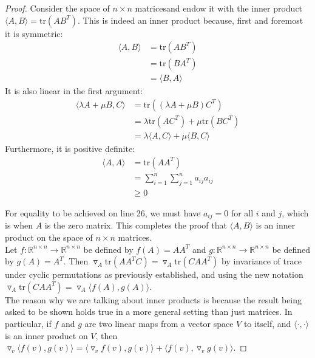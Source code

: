 \documentclass{article}
\begin{document}
\begin{proof}
Consider the space of $n \times n$ matricesand endow it 
with the inner product $\langle A, B \rangle = \mathrm{tr}(AB^T)$. This is indeed an 
inner product because, first and foremost it is symmetric:
\begin{align}
    \langle A, B \rangle &= \mathrm{tr}(AB^T) \\
    &= \mathrm{tr}(BA^T) \\
    &= \langle B, A \rangle
\end{align}
It is also linear in the first argument:
\begin{align}
    \langle \lambda A + \mu B, C \rangle &= \mathrm{tr}((\lambda A + \mu B) C^T) \\
    &= \lambda \mathrm{tr}(AC^T) + \mu \mathrm{tr}(BC^T) \\
    &= \lambda \langle A, C \rangle + \mu \langle B, C \rangle
\end{align}
Furthermore, it is positive definite:
\begin{align}
    \langle A, A \rangle &= \mathrm{tr}(AA^T) \\
    &= \sum_{i=1}^n \sum_{j=1}^n a_{ij} a_{ij} \\
    &\geq 0
\end{align}

For equality to be achieved on line 26, we must have $a_{ij} = 0$ for all $i$ and $j$, which is when 
$A$ is the zero matrix. This completes the proof that $\langle A, B \rangle$ is an inner product on 
the space of $n \times n$ matrices.\\

Let $f: \mathbb{R}^{n \times n} \rightarrow \mathbb{R}^{n \times n}$ be defined by $f(A) = A A^T$ and
$g: \mathbb{R}^{n \times n} \rightarrow \mathbb{R}^{n \times n}$ be defined by $g(A) = A^T$. Then 
$\triangledown_A \mathrm{tr}(A A^T C) = \triangledown_A \mathrm{tr}(C A A^T)$ by invariance
of trace under cyclic permutations as previously established, and using the new notation
$\triangledown_A \mathrm{tr}(C A A^T) = \triangledown_A \langle f(A), g(A) \rangle$.\\

The reason why we are talking about inner products is because the result being asked to be shown
holds true in a more general setting than just matrices. 
In particular, if $f$ and $g$ are two linear maps from a vector
space $V$ to itself, and $\langle \cdot, \cdot \rangle$ is an inner product on $V$, then
$\triangledown_v \langle f(v), g(v) \rangle =  \langle \triangledown_v f(v), g(v) \rangle + 
\langle f(v), \triangledown_v g(v) \rangle$.

\end{proof}
\end{document}
